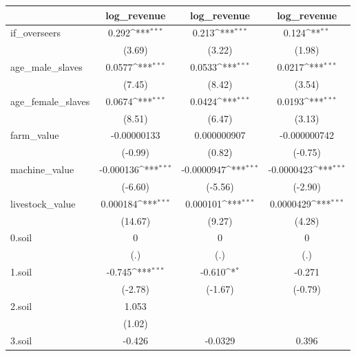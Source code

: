 {
\def\sym#1{\ifmmode^{#1}\else\(^{#1}\)\fi}
\begin{tabular}{l*{3}{c}}
\hline\hline
            &\multicolumn{1}{c}{log\_revenue}&\multicolumn{1}{c}{log\_revenue}&\multicolumn{1}{c}{log\_revenue}\\
\hline
if\_overseers&       0.292\sym{***}&       0.213\sym{***}&       0.124\sym{**} \\
            &      (3.69)         &      (3.22)         &      (1.98)         \\
[1em]
age\_male\_slaves&      0.0577\sym{***}&      0.0533\sym{***}&      0.0217\sym{***}\\
            &      (7.45)         &      (8.42)         &      (3.54)         \\
[1em]
age\_female\_slaves&      0.0674\sym{***}&      0.0424\sym{***}&      0.0193\sym{***}\\
            &      (8.51)         &      (6.47)         &      (3.13)         \\
[1em]
farm\_value  & -0.00000133         & 0.000000907         &-0.000000742         \\
            &     (-0.99)         &      (0.82)         &     (-0.75)         \\
[1em]
machine\_value&   -0.000136\sym{***}&  -0.0000947\sym{***}&  -0.0000423\sym{***}\\
            &     (-6.60)         &     (-5.56)         &     (-2.90)         \\
[1em]
livestock\_value&    0.000184\sym{***}&    0.000101\sym{***}&   0.0000429\sym{***}\\
            &     (14.67)         &      (9.27)         &      (4.28)         \\
[1em]
0.soil      &           0         &           0         &           0         \\
            &         (.)         &         (.)         &         (.)         \\
[1em]
1.soil      &      -0.745\sym{***}&      -0.610\sym{*}  &      -0.271         \\
            &     (-2.78)         &     (-1.67)         &     (-0.79)         \\
[1em]
2.soil      &       1.053         &                     &                     \\
            &      (1.02)         &                     &                     \\
[1em]
3.soil      &      -0.426         &     -0.0329         &       0.396         \\

\end{tabular}}
